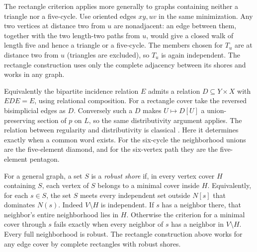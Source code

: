 The rectangle criterion applies more generally to graphs containing
neither a triangle nor a five-cycle. Use oriented edges $xy,uv$ in
the same minimization. Any two vertices at distance two from $u$
are nonadjacent: an edge between them, together with the two
length-two paths from $u$, would give a closed walk of length five
and hence a triangle or a five-cycle. The members chosen for $T_u$
are at distance two from $u$ (triangles are excluded), so $T_u$ is
again independent. The rectangle construction uses only the complete
adjacency between its shores and works in any graph.

Equivalently the bipartite incidence relation $E$ admits a relation
$D\subseteq Y\times X$ with $EDE=E$, using relational composition.
For a rectangle cover take the reversed bisimplicial edges as $D$.
Conversely such a $D$ makes $U\mapsto D[U]$ a union-preserving section
of $p$ on $L$, so the same distributivity argument applies.
The relation between regularity and distributivity is classical
\cite{Zaretskii1962}. Here it determines exactly when a common word
exists. For the six-cycle the neighborhood unions are the five-element
diamond, and for the six-vertex path they are the five-element pentagon.

For a general graph, a set $S$ is a \emph{robust shore} if, in every
vertex cover $H$ containing $S$, each vertex of $S$ belongs to a minimal
cover inside $H$. Equivalently, for each $s\in S$, the set $S$ meets
every independent set outside $N[s]$ that dominates $N(s)$.
Indeed $V\setminus H$ is independent. If $s$ has a neighbor there,
that neighbor's entire neighborhood lies in $H$. Otherwise the
criterion for a minimal cover through $s$ fails exactly when every
neighbor of $s$ has a neighbor in $V\setminus H$. Every full
neighborhood is robust. The rectangle construction above works for
any edge cover by complete rectangles with robust shores.

